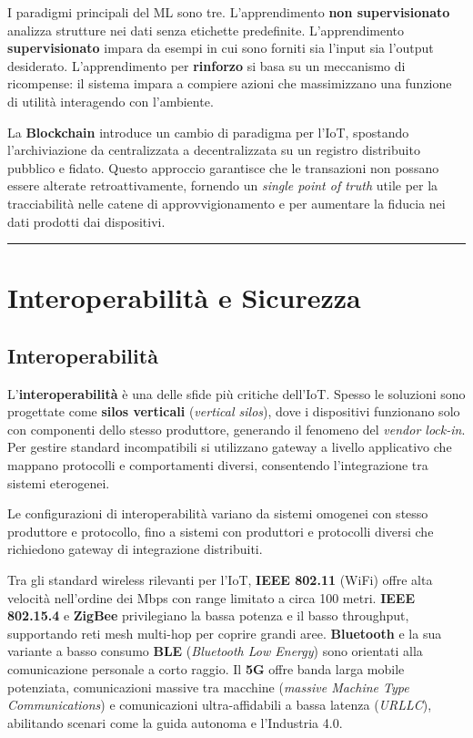 \documentclass[
  italian,
  openany]{book}
\begin{document}
I paradigmi principali del ML sono tre. L'apprendimento \textbf{non
supervisionato} analizza strutture nei dati senza etichette predefinite.
L'apprendimento \textbf{supervisionato} impara da esempi in cui sono
forniti sia l'input sia l'output desiderato. L'apprendimento per
\textbf{rinforzo} si basa su un meccanismo di ricompense: il sistema
impara a compiere azioni che massimizzano una funzione di utilità
interagendo con l'ambiente.

La \textbf{Blockchain} introduce un cambio di paradigma per l'IoT,
spostando l'archiviazione da centralizzata a decentralizzata su un
registro distribuito pubblico e fidato. Questo approccio garantisce che
le transazioni non possano essere alterate retroattivamente, fornendo un
\emph{single point of truth} utile per la tracciabilità nelle catene di
approvvigionamento e per aumentare la fiducia nei dati prodotti dai
dispositivi.

\begin{center}\rule{0.5\linewidth}{0.5pt}\end{center}

\section{Interoperabilità e
Sicurezza}\label{interoperabilituxe0-e-sicurezza}

\subsection{Interoperabilità}\label{interoperabilituxe0}

L'\textbf{interoperabilità} è una delle sfide più critiche dell'IoT.
Spesso le soluzioni sono progettate come \textbf{silos verticali}
(\emph{vertical silos}), dove i dispositivi funzionano solo con
componenti dello stesso produttore, generando il fenomeno del
\emph{vendor lock-in}. Per gestire standard incompatibili si utilizzano
gateway a livello applicativo che mappano protocolli e comportamenti
diversi, consentendo l'integrazione tra sistemi eterogenei.

Le configurazioni di interoperabilità variano da sistemi omogenei con
stesso produttore e protocollo, fino a sistemi con produttori e
protocolli diversi che richiedono gateway di integrazione distribuiti.

Tra gli standard wireless rilevanti per l'IoT, \textbf{IEEE 802.11}
(WiFi) offre alta velocità nell'ordine dei Mbps con range limitato a
circa 100 metri. \textbf{IEEE 802.15.4} e \textbf{ZigBee} privilegiano
la bassa potenza e il basso throughput, supportando reti mesh multi-hop
per coprire grandi aree. \textbf{Bluetooth} e la sua variante a basso
consumo \textbf{BLE} (\emph{Bluetooth Low Energy}) sono orientati alla
comunicazione personale a corto raggio. Il \textbf{5G} offre banda larga
mobile potenziata, comunicazioni massive tra macchine (\emph{massive
Machine Type Communications}) e comunicazioni ultra-affidabili a bassa
latenza (\emph{URLLC}), abilitando scenari come la guida autonoma e
l'Industria 4.0.
\end{document}
